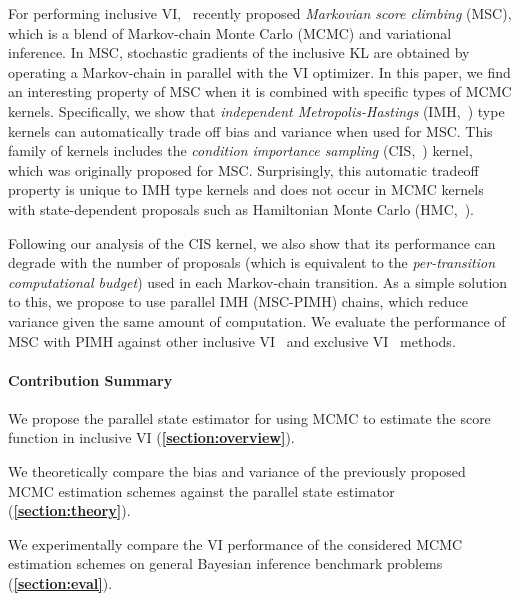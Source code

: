 For performing inclusive VI,~\citet{NEURIPS2020_b2070693, pmlr-v124-ou20a} recently proposed \textit{Markovian score climbing} (MSC), which is a blend of Markov-chain Monte Carlo (MCMC) and variational inference.
In MSC, stochastic gradients of the inclusive KL are obtained by operating a Markov-chain in parallel with the VI optimizer.
In this paper, we find an interesting property of MSC when it is combined with specific types of MCMC kernels.
Specifically, we show that \textit{independent Metropolis-Hastings} (IMH,~\citealt{robert_monte_2004}) type kernels can automatically trade off bias and variance when used for MSC.
This family of kernels includes the \textit{condition importance sampling} (CIS,~\citealt{NEURIPS2020_b2070693}) kernel, which was originally proposed for MSC.
Surprisingly, this automatic tradeoff property is unique to IMH type kernels and does not occur in MCMC kernels with state-dependent proposals such as Hamiltonian Monte Carlo (HMC,~\citealt{duane_hybrid_1987, neal_mcmc_2011, betancourt_conceptual_2017}).

Following our analysis of the CIS kernel, we also show that its performance can degrade with the number of proposals (which is equivalent to the \textit{per-transition computational budget}) used in each Markov-chain transition.
As a simple solution to this, we propose to use parallel IMH (MSC-PIMH) chains, which reduce variance given the same amount of computation.
We evaluate the performance of MSC with PIMH against other inclusive VI~\citep{DBLP:journals/corr/BornscheinB14, NEURIPS2020_b2070693} and exclusive VI~\citep{pmlr-v33-ranganath14, JMLR:v18:16-107} methods.

\vspace{-0.1in}
\paragraph{Contribution Summary}
\begin{enumerate*}[label=\textbf{(\roman*)}]
\item We propose the parallel state estimator for using MCMC to estimate the score function in inclusive VI (\textbf{\cref{section:overview}}).
\item We theoretically compare the bias and variance of the previously proposed MCMC estimation schemes against the parallel state estimator (\textbf{\cref{section:theory}}).
\item We experimentally compare the VI performance of the considered MCMC estimation schemes on general Bayesian inference benchmark problems (\textbf{\cref{section:eval}}).
\end{enumerate*}

